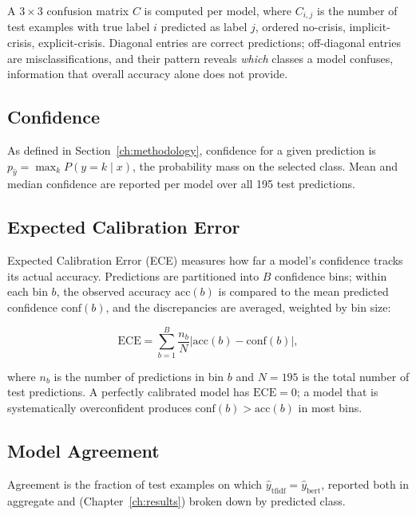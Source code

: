 A $3\times3$ confusion matrix $C$ is computed per model, where $C_{i,j}$ is the number of test examples with true label $i$ predicted as label $j$, ordered no-crisis, implicit-crisis, explicit-crisis. Diagonal entries are correct predictions; off-diagonal entries are misclassifications, and their pattern reveals \emph{which} classes a model confuses, information that overall accuracy alone does not provide.

\subsection{Confidence}

As defined in Section~\ref{ch:methodology}, confidence for a given prediction is $p_{\hat{y}} = \max_k P(y=k\mid x)$, the probability mass on the selected class. Mean and median confidence are reported per model over all 195 test predictions.

\subsection{Expected Calibration Error}

Expected Calibration Error (ECE) measures how far a model's confidence tracks its actual accuracy. Predictions are partitioned into $B$ confidence bins; within each bin $b$, the observed accuracy $\mathrm{acc}(b)$ is compared to the mean predicted confidence $\mathrm{conf}(b)$, and the discrepancies are averaged, weighted by bin size:

\begin{equation}
\mathrm{ECE} = \sum_{b=1}^{B} \frac{n_b}{N} \left| \mathrm{acc}(b) - \mathrm{conf}(b) \right|,
\end{equation}

where $n_b$ is the number of predictions in bin $b$ and $N = 195$ is the total number of test predictions. A perfectly calibrated model has $\mathrm{ECE} = 0$; a model that is systematically overconfident produces $\mathrm{conf}(b) > \mathrm{acc}(b)$ in most bins.

\subsection{Model Agreement}

Agreement is the fraction of test examples on which $\hat{y}_{\mathrm{tfidf}} = \hat{y}_{\mathrm{bert}}$, reported both in aggregate and (Chapter~\ref{ch:results}) broken down by predicted class.

